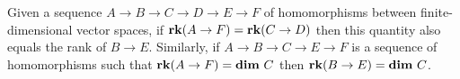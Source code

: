 %

\begin{lemma}\label{lem:sandwich}
    Given a sequence $A\to B\to C\to D\to E\to F$ of homomorphisms between finite-dimensional vector spaces, if $\mathbf{rk}(A\to F) = \mathbf{rk}(C\to D)$ then this quantity also equals the rank of $B\to E$.
    Similarly, if $A\to B\to C\to E\to F$ is a sequence of homomorphisms such that $\mathbf{rk}(A\to F) = \mathbf{dim}~C$ then $\mathbf{rk}(B\to E) = \mathbf{dim}~C$.
\end{lemma}

